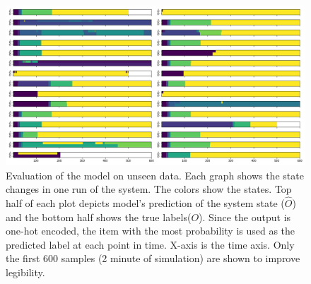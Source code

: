 \begin{figure}[ht]
    \centering
    \includegraphics[width=\linewidth]{Sections/test_0.png}
    \caption{Evaluation of the model on unseen data. Each graph shows the state changes in one run of the system. The colors show the states. Top half of each plot depicts model's prediction of the system state ($\hat{O}$) and the bottom half shows the true labels($O$). Since the output is one-hot encoded, the item with the most probability is used as the predicted label at each point in time. X-axis is the time axis. Only the first 600 samples (2 minute of simulation) are shown to improve legibility.}
    \label{fig:test_0}
\end{figure}

